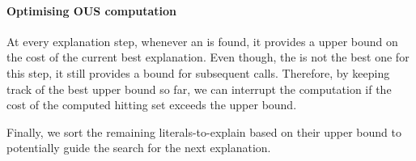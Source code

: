 \paragraph{Optimising OUS computation} At every explanation step, whenever an \omus is found, it provides a upper bound on the cost of the current best explanation. Even though, the \omus is not the best one for this step, it still provides a bound for subsequent \omus calls. 
Therefore, by keeping track of the best upper bound so far, we can interrupt the \omus computation if the cost of the computed hitting set exceeds the upper bound.

Finally, we sort the remaining literals-to-explain based on their upper bound to potentially guide the search for the next explanation.





